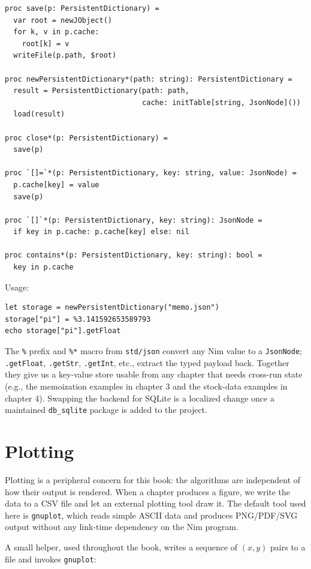 \documentclass[justified, sixbynine]{tufte-book}
\def\ft{\small\tt}
\theoremstyle{plain}%
\newtheorem * {corollary}{Corollary}
\theoremstyle{definition}
\theoremstyle{remark}
\newtheorem * {remark}{Remark}
\newtheorem * {note}{Note}
\begin{document}
\begin{fullwidth}
\begin{lstlisting}[caption={in file: {\ft nlib/persistent.nim}}]
proc save(p: PersistentDictionary) =
  var root = newJObject()
  for k, v in p.cache:
    root[k] = v
  writeFile(p.path, $root)

proc newPersistentDictionary*(path: string): PersistentDictionary =
  result = PersistentDictionary(path: path,
                                cache: initTable[string, JsonNode]())
  load(result)

proc close*(p: PersistentDictionary) =
  save(p)

proc `[]=`*(p: PersistentDictionary, key: string, value: JsonNode) =
  p.cache[key] = value
  save(p)

proc `[]`*(p: PersistentDictionary, key: string): JsonNode =
  if key in p.cache: p.cache[key] else: nil

proc contains*(p: PersistentDictionary, key: string): bool =
  key in p.cache
\end{lstlisting}

Usage:

\begin{lstlisting}
let storage = newPersistentDictionary("memo.json")
storage["pi"] = %3.141592653589793
echo storage["pi"].getFloat
\end{lstlisting}

The {\ft \%} prefix and {\ft \%*} macro from {\ft std/json} convert any Nim value to a {\ft JsonNode}; {\ft .getFloat}, {\ft .getStr}, {\ft .getInt}, etc., extract the typed payload back. Together they give us a key-value store usable from any chapter that needs cross-run state (e.g., the memoization examples in chapter 3 and the stock-data examples in chapter 4). Swapping the backend for SQLite is a localized change once a maintained {\ft db\_sqlite} package is added to the project.

\goodbreak\section{Plotting}


Plotting is a peripheral concern for this book: the algorithms are independent of how their output is rendered. When a chapter produces a figure, we write the data to a CSV file and let an external plotting tool draw it. The default tool used here is {\ft gnuplot}, which reads simple ASCII data and produces PNG/PDF/SVG output without any link-time dependency on the Nim program.

A small helper, used throughout the book, writes a sequence of $(x, y)$ pairs to a file and invokes {\ft gnuplot}:


\end{fullwidth}
\end{document}
